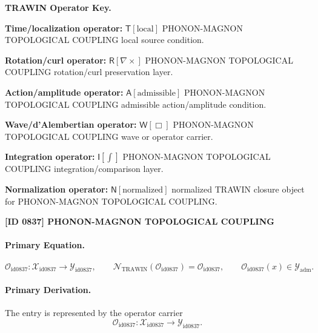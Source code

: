 \par\vspace{0.45\baselineskip}
\noindent\begin{minipage}[t]{\linewidth}
\begingroup
\small
\raggedright
\textbf{TRAWIN Operator Key.}\par
\noindent\textbf{Time/localization operator:} $\mathsf{T}\!\left[\mathrm{local}\right]$ PHONON-MAGNON TOPOLOGICAL COUPLING local source condition.\par
\noindent\textbf{Rotation/curl operator:} $\mathsf{R}\!\left[\nabla\times\right]$ PHONON-MAGNON TOPOLOGICAL COUPLING rotation/curl preservation layer.\par
\noindent\textbf{Action/amplitude operator:} $\mathsf{A}\!\left[\mathrm{admissible}\right]$ PHONON-MAGNON TOPOLOGICAL COUPLING admissible action/amplitude condition.\par
\noindent\textbf{Wave/d'Alembertian operator:} $\mathsf{W}\!\left[\Box\right]$ PHONON-MAGNON TOPOLOGICAL COUPLING wave or operator carrier.\par
\noindent\textbf{Integration operator:} $\mathsf{I}\!\left[\int\right]$ PHONON-MAGNON TOPOLOGICAL COUPLING integration/comparison layer.\par
\noindent\textbf{Normalization operator:} $\mathsf{N}\!\left[\mathrm{normalized}\right]$ normalized TRAWIN closure object for PHONON-MAGNON TOPOLOGICAL COUPLING.\par
\endgroup
\end{minipage}

\clearpage
\noindent\textbf{[ID 0837] PHONON-MAGNON TOPOLOGICAL COUPLING}\par
\vspace{0.35em}
\paragraph{Primary Equation.}
\[
\mathcal{O}_{\mathrm{id0837}}:\mathcal{X}_{\mathrm{id0837}}\longrightarrow \mathcal{Y}_{\mathrm{id0837}},\qquad
\mathcal{N}_{\mathrm{TRAWIN}}(\mathcal{O}_{\mathrm{id0837}})=\mathcal{O}_{\mathrm{id0837}},\qquad
\mathcal{O}_{\mathrm{id0837}}(x)\in\mathcal{Y}_{\mathrm{adm}}.
\]

\paragraph{Primary Derivation.} The entry is represented by the operator carrier\[
\mathcal{O}_{\mathrm{id0837}}:\mathcal{X}_{\mathrm{id0837}}\longrightarrow \mathcal{Y}_{\mathrm{id0837}}.
\]

